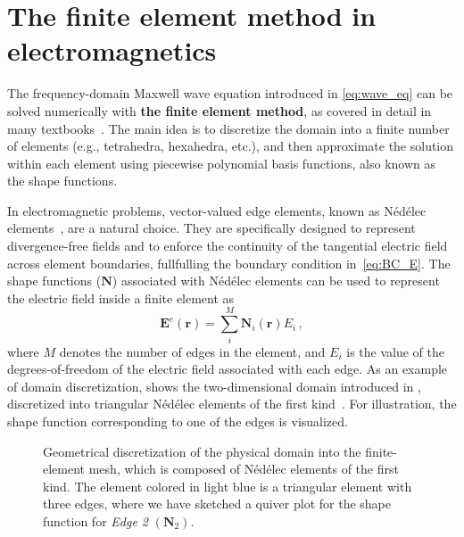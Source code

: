 
    \section{The finite element method in electromagnetics}\label{sec:fem}
 The frequency-domain Maxwell wave equation introduced in \eqref{eq:wave_eq} can be solved numerically with \textbf{the finite element method}, as covered in detail 
 in many textbooks~\cite{jin, fem_book}. The main idea is to discretize the domain into a finite number of elements (e.g., tetrahedra, hexahedra, etc.), and then approximate the solution
 within each element using piecewise polynomial basis functions, also known as the shape functions. 
 
 In electromagnetic problems, vector-valued edge elements, known as Né\-dé\-lec elements~\cite{nedelec}, 
 are a natural choice. They are specifically designed to represent divergence-free fields and 
 to enforce the continuity of the tangential electric field across element boundaries, fullfulling the boundary condition in~\eqref{eq:BC_E}.
 The shape functions ($\mathbf{N}$) associated with Nédélec elements can be used to represent the electric field inside a finite element as
    \begin{equation}\label{eq:ned_shape}
 \boldsymbol{E}^e(\mathbf{r})=\sum^M_i \boldsymbol{N}_i(\mathbf{r}) E_i\,,
    \end{equation}
 where $M$ denotes the number of edges in the element, and $E_i$ is the value of the degrees-of-freedom of the electric field associated with each edge. As an example
  of domain discretization,  shows the two-dimensional domain introduced in , discretized
   into triangular Nédélec elements of the first kind~\cite{nedelec}. For illustration, the shape function corresponding to one of the edges is visualized.

    \begin{figure}[tb]
        \centering

        \caption{Geometrical discretization of the physical domain into the finite-element mesh, which is composed of Nédélec elements of the first kind. The element colored
 in light blue is a triangular element with three edges, where
 we have sketched a quiver plot for the shape function for \textit{Edge
 2} $(\mathbf{N}_2)$.}
        \label{fig:fem}
    \end{figure}
    
